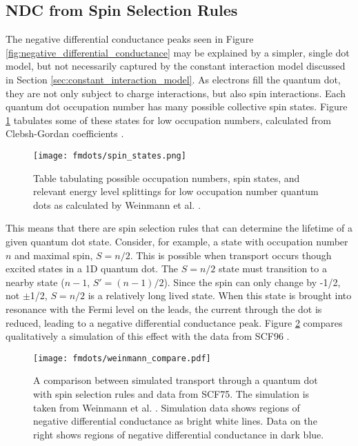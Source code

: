 \subsection{NDC from Spin Selection Rules}
\label{sec:single_dot_model}

The negative differential conductance peaks seen in Figure \ref{fig:negative_differential_conductance} may be explained by a simpler, single dot model, but not necessarily captured by the constant interaction model discussed in Section \ref{sec:constant_interaction_model}. As electrons fill the quantum dot, they are not only subject to charge interactions, but also spin interactions. Each quantum dot occupation number has many possible collective spin states. Figure \ref{fig:spin_states} tabulates some of these states for low occupation numbers, calculated from Clebsh-Gordan coefficients \cite{Weinmann1994} .

\begin{figure}
    \centering
    \texttt{[image: fmdots/spin\_states.png]}
    \caption{Table tabulating possible occupation numbers, spin states, and relevant energy level splittings for low occupation number quantum dots as calculated by Weinmann et al. \cite{Weinmann1994}.}
    \label{fig:spin_states}
\end{figure}

This means that there are spin selection rules that can determine the lifetime of a given quantum dot state. Consider, for example, a state with occupation number $n$ and maximal spin, $S=n/2$. This is possible when transport occurs though excited states in a 1D quantum dot. The $S=n/2$ state must transition to a nearby state ($n-1$, $S'=(n-1)/2$). Since the spin can only change by -1/2, not $\pm$1/2, $S=n/2$ is a relatively long lived state. When this state is brought into resonance with the Fermi level on the leads, the current through the dot is reduced, leading to a negative differential conductance peak. Figure \ref{fig:weinmann_compare} compares qualitatively a simulation of this effect with the data from SCF96 \cite{Weinmann1995}. 

\begin{figure}
    \centering
    \texttt{[image: fmdots/weinmann\_compare.pdf]}
    \caption{A comparison between simulated transport through a quantum dot with spin selection rules and data from SCF75. The simulation is taken from Weinmann et al. \cite{Weinmann1995}. Simulation data shows regions of negative differential conductance as bright white lines. Data on the right shows regions of negative differential conductance in dark blue.}
    \label{fig:weinmann_compare}
\end{figure}

